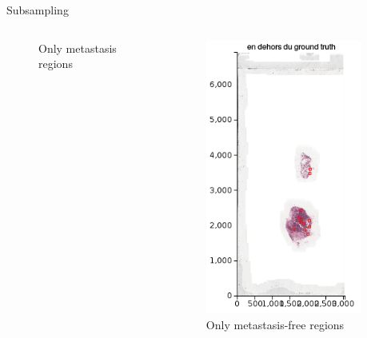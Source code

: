 \documentclass{beamer}
\begin{document}
\begin{frame}{Subsampling}
\begin{columns}[T]
\begin{column}{.25\textwidth}
\begin{figure}[!ht]
\caption{Only metastasis regions}
\label{}
\end{figure}
\end{column}%
\begin{column}{.25\textwidth}
\begin{figure}[!ht]
\centering
\includegraphics[width=\textwidth]{OnlyNormal.png}
\caption{Only metastasis-free regions}
\label{}
\end{figure}
\end{column}%
\begin{column}{.25\textwidth}

\end{column}
\end{columns}
\end{frame}
\end{document}

